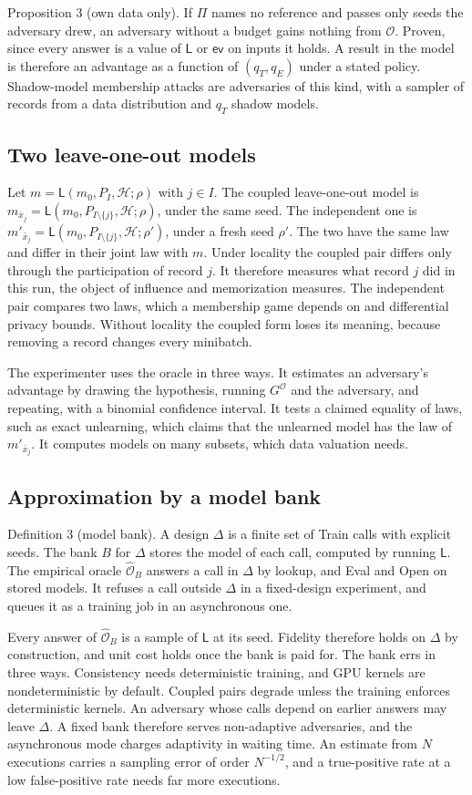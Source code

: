 \documentclass{labreport}
\newcommand{\Hc}{\mathcal{H}}
\newcommand{\Lf}{\mathsf{L}}
\newcommand{\ev}{\mathsf{ev}}
\newcommand{\Or}{\mathcal{O}}
\newcommand{\Ob}{\widehat{\mathcal{O}}}
\newcommand{\call}[1]{\textsf{#1}}
\begin{document}
Proposition 3 (own data only). If $\Pi$ names no reference and passes only seeds
the adversary drew, an adversary without a budget gains nothing from $\Or$.
Proven, since every answer is a value of $\Lf$ or $\ev$ on inputs it holds. A
result in the model is therefore an advantage as a function of $(q_T,q_E)$ under
a stated policy. Shadow-model membership attacks are
adversaries of this kind, with a sampler of records from a data distribution
and $q_T$ shadow models.

\subsection*{Two leave-one-out models}
Let $m=\Lf(m_0,P_I,\Hc;\rho)$ with $j\in I$. The coupled leave-one-out model is
$m_{\bar{x}_j}=\Lf(m_0,P_{I\setminus\{j\}},\Hc;\rho)$, under the same seed. The
independent one is $m'_{\bar{x}_j}=\Lf(m_0,P_{I\setminus\{j\}},\Hc;\rho')$, under
a fresh seed $\rho'$. The two have the same law and differ in their joint law
with $m$. Under locality the coupled pair differs only through the
participation of record $j$. It therefore measures what record $j$ did in this
run, the object of influence and memorization measures. The independent pair compares
two laws, which a membership game depends on and differential privacy bounds.
Without locality the coupled form loses its meaning, because removing a record
changes every minibatch.

The experimenter uses the oracle in three ways. It estimates an adversary's
advantage by drawing the hypothesis, running $G^{\Or}$ and the adversary, and
repeating, with a binomial confidence interval. It tests a claimed equality of
laws, such as exact unlearning, which claims that the unlearned model has the law
of $m'_{\bar{x}_j}$. It computes models on many subsets, which data valuation
needs.

\subsection*{Approximation by a model bank}
Definition 3 (model bank). A design $\Delta$ is a finite set of \call{Train}
calls with explicit seeds. The bank $B$ for $\Delta$ stores the model of each call,
computed by running $\Lf$. The empirical oracle $\Ob_B$ answers a call in $\Delta$
by lookup, and \call{Eval} and \call{Open} on stored models. It refuses a call
outside $\Delta$ in a fixed-design experiment, and queues it as a training job in
an asynchronous one.

Every answer of $\Ob_B$ is a sample of $\Lf$ at its seed. Fidelity therefore
holds on $\Delta$ by construction, and unit cost holds once the bank is paid
for. The bank errs in
three ways. Consistency needs deterministic training, and GPU kernels are
nondeterministic by default. Coupled pairs degrade unless the training enforces
deterministic kernels. An adversary whose calls depend on earlier answers may leave
$\Delta$. A fixed bank therefore serves non-adaptive adversaries, and the
asynchronous mode charges adaptivity in waiting time. An estimate from $N$ executions carries
a sampling error of order $N^{-1/2}$, and a true-positive rate at a low
false-positive rate needs far more executions.
\end{document}

